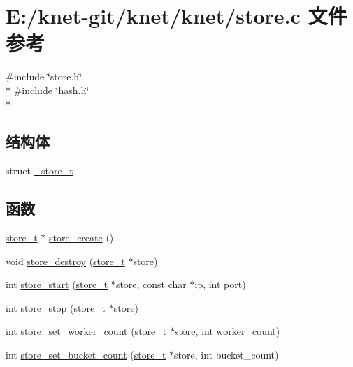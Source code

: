 \hypertarget{a00071}{}\section{E\+:/knet-\/git/knet/knet/store.c 文件参考}
\label{a00071}
{\ttfamily \#include \char`\"{}store.\+h\char`\"{}}\\*
{\ttfamily \#include \char`\"{}hash.\+h\char`\"{}}\\*
\subsection*{结构体}
\begin{DoxyCompactItemize}
\item 
struct \hyperlink{a00027}{\+\_\+store\+\_\+t}
\end{DoxyCompactItemize}
\subsection*{函数}
\begin{DoxyCompactItemize}
\item 
\hyperlink{a00044_ac5e23aa8669eede04d771010dbd201b4_ac5e23aa8669eede04d771010dbd201b4}{store\+\_\+t} $\ast$ \hyperlink{a00071_a1af7550aea3890ee5b11b7a63d9ab515_a1af7550aea3890ee5b11b7a63d9ab515}{store\+\_\+create} ()
\item 
void \hyperlink{a00071_a8e0eefdf8c2410878667f0c535909cf8_a8e0eefdf8c2410878667f0c535909cf8}{store\+\_\+destroy} (\hyperlink{a00044_ac5e23aa8669eede04d771010dbd201b4_ac5e23aa8669eede04d771010dbd201b4}{store\+\_\+t} $\ast$store)
\item 
int \hyperlink{a00071_a679dfe593c799419037e5d200386ecc7_a679dfe593c799419037e5d200386ecc7}{store\+\_\+start} (\hyperlink{a00044_ac5e23aa8669eede04d771010dbd201b4_ac5e23aa8669eede04d771010dbd201b4}{store\+\_\+t} $\ast$store, const char $\ast$ip, int port)
\item 
int \hyperlink{a00071_ac18172cdd31b0f5ec3f3be7750a1d49c_ac18172cdd31b0f5ec3f3be7750a1d49c}{store\+\_\+stop} (\hyperlink{a00044_ac5e23aa8669eede04d771010dbd201b4_ac5e23aa8669eede04d771010dbd201b4}{store\+\_\+t} $\ast$store)
\item 
int \hyperlink{a00071_a02e291e9e967e22a66b0907d776f139f_a02e291e9e967e22a66b0907d776f139f}{store\+\_\+set\+\_\+worker\+\_\+count} (\hyperlink{a00044_ac5e23aa8669eede04d771010dbd201b4_ac5e23aa8669eede04d771010dbd201b4}{store\+\_\+t} $\ast$store, int worker\+\_\+count)
\item 
int \hyperlink{a00071_a869ae551132a316c05015e9855e9ff68_a869ae551132a316c05015e9855e9ff68}{store\+\_\+set\+\_\+bucket\+\_\+count} (\hyperlink{a00044_ac5e23aa8669eede04d771010dbd201b4_ac5e23aa8669eede04d771010dbd201b4}{store\+\_\+t} $\ast$store, int bucket\+\_\+count)
\end{DoxyCompactItemize}


